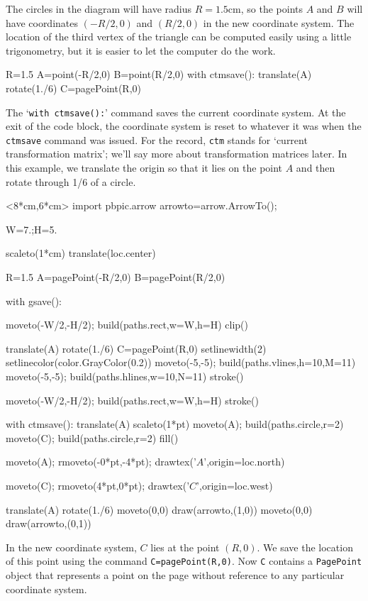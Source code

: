 \documentclass[12pt]{article}
\def\code#1{{\tt #1}}
\begin{document}
The circles in the diagram will have radius $R=1.5$cm, so the
points $A$ and $B$ will have coordinates $(-R/2,0)$ and $(R/2,0)$
in the new coordinate system. The location of the third vertex
of the triangle can be computed easily using a little trigonometry,
but it is easier to let the computer do the work.
\begin{snippet}
R=1.5
A=point(-R/2,0)
B=point(R/2,0)
with ctmsave():
  translate(A)
  rotate(1./6)
  C=pagePoint(R,0)
\end{snippet}
The `\code{with ctmsave():}' command saves the current coordinate system.
At the exit of the code block, the coordinate system is reset to whatever
it was when the \code{ctmsave} command was issued.  For the record, \code{ctm}
stands for `current transformation matrix'; we'll say more about transformation matrices
later.  In this example, we translate the origin so that it lies on the
point $A$ and then rotate through 1/6 of a circle. 

\hfil\begin{pbpic}<8*cm,6*cm>
import pbpic.arrow
arrowto=arrow.ArrowTo();

W=7.;H=5.

scaleto(1*cm)
translate(loc.center)

R=1.5
A=pagePoint(-R/2,0)
B=pagePoint(R/2,0)

with gsave():

  moveto(-W/2,-H/2); build(paths.rect,w=W,h=H)
  clip()
  
  translate(A)
  rotate(1./6)
  C=pagePoint(R,0)
  setlinewidth(2)
  setlinecolor(color.GrayColor(0.2))
  moveto(-5,-5); build(paths.vlines,h=10,M=11)
  moveto(-5,-5); build(paths.hlines,w=10,N=11)
  stroke()

moveto(-W/2,-H/2); build(paths.rect,w=W,h=H)
stroke()

with ctmsave():
  translate(A)
  scaleto(1*pt)
  moveto(A); build(paths.circle,r=2)
  moveto(C); build(paths.circle,r=2)  
  fill()

moveto(A); rmoveto(-0*pt,-4*pt);
drawtex('$A$',origin=loc.north)

moveto(C); rmoveto(4*pt,0*pt);
drawtex('$C$',origin=loc.west)


translate(A)
rotate(1./6)
moveto(0,0)
draw(arrowto,(1,0))
moveto(0,0)
draw(arrowto,(0,1))

\end{pbpic}

In the new coordinate system, $C$ lies at the point $(R,0)$.  We
save the location of this point using the command \code{C=pagePoint(R,0)}.
Now \code{C} contains a \code{PagePoint} object that represents a point 
on the page without reference to any particular coordinate system.
\end{document}
